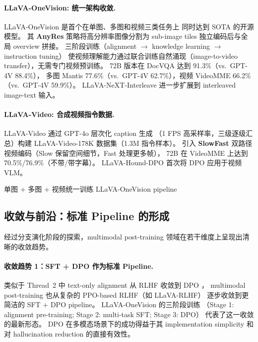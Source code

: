 \paragraph{LLaVA-OneVision: 统一架构收敛.}
LLaVA-OneVision \cite{li2024llava-onevision} 是首个在单图、多图和视频三类任务上
同时达到 SOTA 的开源模型。
其 \textbf{AnyRes} 策略将高分辨率图像分割为 sub-image tiles 独立编码后与全局 overview 拼接。
三阶段训练（alignment $\rightarrow$ knowledge learning $\rightarrow$ instruction tuning）
使视频理解能力通过联合训练自然涌现（image-to-video transfer），无需专门视频预训练。
72B 版本在 DocVQA 达到 91.3\%（vs.\ GPT-4V 88.4\%），
多图 Mantis 77.6\%（vs.\ GPT-4V 62.7\%），视频 VideoMME 66.2\%（vs.\ GPT-4V 59.9\%）。
LLaVA-NeXT-Interleave \cite{li2024llava-next-interleave}
进一步扩展到 interleaved image-text 输入。

\paragraph{LLaVA-Video: 合成视频指令数据.}
LLaVA-Video \cite{zhang2024llava-video} 通过 GPT-4o 层次化 caption 生成
（1 FPS 高采样率，三级逐级汇总）构建 LLaVA-Video-178K 数据集（1.3M 指令样本）。
引入 \textbf{SlowFast} 双路径视频编码（Slow 保留空间细节，Fast 处理更多帧），
72B 在 VideoMME 上达到 70.5\%/76.9\%（不带/带字幕）。
LLaVA-Hound-DPO \cite{zhang2024llava-hound} 首次将 DPO 应用于视频 VLM。

  {单图 + 多图 + 视频统一训练}
  {LLaVA-OneVision pipeline}

\subsection{收敛与前沿：标准 Pipeline 的形成}
\label{sec:t5-convergence}

经过分支演化阶段的探索，multimodal post-training 领域在若干维度上呈现出清晰的收敛趋势。

\paragraph{收敛趋势 1：SFT + DPO 作为标准 Pipeline.}
类似于 Thread~2 中 text-only alignment 从 RLHF 收敛到 DPO
，
multimodal post-training 也从复杂的 PPO-based RLHF（如 LLaVA-RLHF）
逐步收敛到更简洁的 SFT + DPO pipeline。
LLaVA-OneVision \cite{li2024llava-onevision} 的三阶段训练
（Stage 1: alignment pre-training; Stage 2: multi-task SFT; Stage 3: DPO）
代表了这一收敛的最新形态。
DPO 在多模态场景下的成功得益于其 implementation simplicity
和对 hallucination reduction 的直接有效性。


